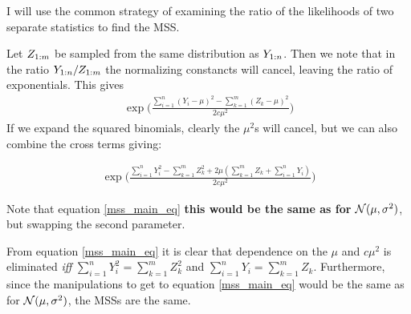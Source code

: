 
I will use the common strategy of examining the ratio of the likelihoods of two separate statistics to find the MSS.

Let $\samp[m]{Z}$ be sampled from the same distribution as $\samp{Y}$.
Then we note that in the ratio $\samp{Y}/\samp[m]{Z}$ the normalizing constancts will cancel, leaving the ratio of exponentials.
This gives
\begin{align*}
    \exp \Big(\frac{\sum_{i=1}^n(Y_i - \mu)^2 - \sum_{k=1}^m(Z_k - \mu)^2}{2c\mu^2}\Big)
\end{align*}
If we expand the squared binomials, clearly the $\mu^2$s will cancel, but we can also combine the cross terms giving:

\begin{align}
    \label{mss_main_eq}
    \exp \Big(\frac{\sum_{i=1}^n Y_i^2 - \sum_{k=1}^m Z_k^2  + 2\mu(\sum_{k=1}^m Z_k +\sum_{i=1}^n Y_i)}{2c\mu^2}\Big)
\end{align}

Note that equation \ref{mss_main_eq} \textbf{this would be the same as for } $\Normal{\mu}{\sigma^2}$, but swapping the second parameter.

From equation \ref{mss_main_eq} it is clear that dependence on the $\mu$ and $c\mu^2$ is eliminated \textit{iff} $\sum_{i=1}^n Y_i^2 = \sum_{k=1}^m Z_k^2$ and $\sum_{i=1}^n Y_i = \sum_{k=1}^m Z_k$.
Furthermore, since the manipulations to get to equation \ref{mss_main_eq} would be the same as for $\Normal{\mu}{\sigma^2}$, the MSSs are the same.


